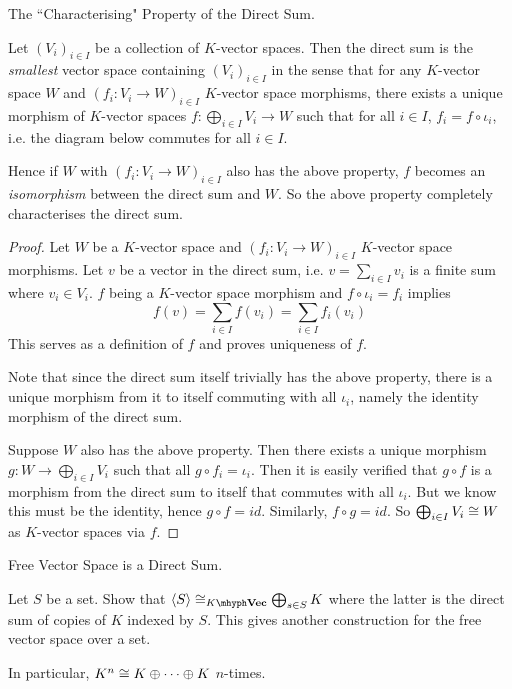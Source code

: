 \documentclass[../book.tex]{subfiles}
\begin{document}
\begin{thm} The ``Characterising" Property of the Direct Sum.
    
    Let $(V_i)_{i\in I}$ be a collection of $K$-vector spaces.
    Then the direct sum is the \emph{smallest} vector space 
    containing $(V_i)_{i\in I}$ in the sense that
    for any $K$-vector space $W$ and 
    $(f_i : V_i \to W)_{i\in I}$ $K$-vector space morphisms,
    there exists a unique morphism of $K$-vector spaces 
    $f : \bigoplus_{i\in I} V_i \to W$ such that for all $i\in I$, 
    $f_i = f \circ \iota_i$,
    i.e. the diagram below commutes for all $i \in I$.  
    \begin{figure} [ht]
        \centering
    \end{figure}

    
    Hence if $W$ with $(f_i : V_i \to W)_{i\in I}$ also has the above property,
    $f$ becomes an \emph{isomorphism} between the direct sum and $W$.
    So the above property completely characterises the direct sum. 
\end{thm}
\begin{proof}
    Let $W$ be a $K$-vector space and 
    $(f_i : V_i \to W)_{i\in I}$ $K$-vector space morphisms.
    Let $v$ be a vector in the direct sum, 
    i.e. $v = \sum_{i\in I} v_i$ is a finite sum where $v_i \in V_i$. 
    $f$ being a $K$-vector space morphism and $f \circ \iota_i = f_i$ implies \[
        f(v) = \sum_{i\in I} f(v_i) = \sum_{i\in I} f_i(v_i)
    \]
    This serves as a definition of $f$ and proves uniqueness of $f$. 
    
    Note that since the direct sum itself trivially has the above property, 
    there is a unique morphism from it to itself commuting with all $\iota_i$,
    namely the identity morphism of the direct sum. 
    
    Suppose $W$ also has the above property. 
    Then there exists a unique morphism $g : W \to \bigoplus_{i\in I} V_i$
    such that all $g \circ f_i = \iota_i$. 
    Then it is easily verified that $g \circ f$ is a morphism 
    from the direct sum to itself that commutes with all $\iota_i$.
    But we know this must be the identity, hence $g \circ f = id$. 
    Similarly, $f \circ g = id$. 
    So $\bigoplus_{i\in I} V_i \cong W$ as $K$-vector spaces via $f$. 
\end{proof}
\begin{ex} Free Vector Space is a Direct Sum.
    
    Let $S$ be a set. 
    Show that $\<S\> \iso_{\KVec} \bigoplus_{s\in S} K$ where the latter is
    the direct sum of copies of $K$ indexed by $S$. 
    This gives another construction for the free vector space over a set. 
    
    In particular, $K^n \cong K \oplus \cdots \oplus K$ $n$-times. 
\end{ex}
\end{document}
